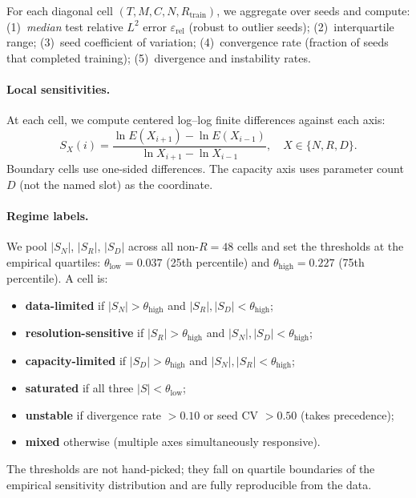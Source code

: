 \documentclass[11pt]{article}
\newcommand{\Rtrain}{R_{\mathrm{train}}}
\newcommand{\relLtwo}{\varepsilon_{\mathrm{rel}}}
\newcommand{\threshLow}{0.037}
\newcommand{\threshHigh}{0.227}
\begin{document}
For each diagonal cell $(T, M, C, N, \Rtrain)$, we aggregate over
seeds and compute: (1)~\emph{median} test relative $L^2$ error
$\relLtwo$ (robust to outlier seeds); (2)~interquartile range;
(3)~seed coefficient of variation; (4)~convergence rate (fraction
of seeds that completed training); (5)~divergence and instability
rates.

\paragraph{Local sensitivities.}
At each cell, we compute centered log--log finite differences against
each axis:
\begin{equation}
  S_X(i) = \frac{\ln E(X_{i+1}) - \ln E(X_{i-1})}
                 {\ln X_{i+1} - \ln X_{i-1}}, \quad
  X \in \{N, R, D\}.
\end{equation}
Boundary cells use one-sided differences. The capacity axis uses
parameter count $D$ (not the named slot) as the coordinate.

\paragraph{Regime labels.}
We pool $|S_N|$, $|S_R|$, $|S_D|$ across all non-$R{=}48$ cells
and set the thresholds at the empirical quartiles:
$\theta_{\mathrm{low}} = \threshLow$ (25th percentile) and
$\theta_{\mathrm{high}} = \threshHigh$ (75th percentile). A cell is:
\begin{itemize}[nosep]
  \item \textbf{data-limited} if $|S_N| > \theta_{\mathrm{high}}$
    and $|S_R|, |S_D| < \theta_{\mathrm{high}}$;
  \item \textbf{resolution-sensitive} if $|S_R| > \theta_{\mathrm{high}}$
    and $|S_N|, |S_D| < \theta_{\mathrm{high}}$;
  \item \textbf{capacity-limited} if $|S_D| > \theta_{\mathrm{high}}$
    and $|S_N|, |S_R| < \theta_{\mathrm{high}}$;
  \item \textbf{saturated} if all three $|S| < \theta_{\mathrm{low}}$;
  \item \textbf{unstable} if divergence rate $> 0.10$ or seed CV
    $> 0.50$ (takes precedence);
  \item \textbf{mixed} otherwise (multiple axes simultaneously
    responsive).
\end{itemize}
The thresholds are not hand-picked; they fall on quartile boundaries
of the empirical sensitivity distribution and are fully reproducible
from the data.
\end{document}
